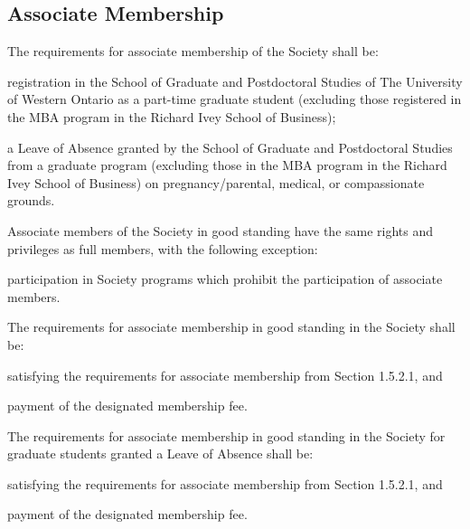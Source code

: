 \subsection{Associate Membership}
	\begin{longenum}[label*=\thesubsection.\arabic*., align=left]
  	\item  The requirements for associate membership of the Society shall be:
    	\begin{longenum}[label*=\arabic*., align=left]
    	\item registration in the School of Graduate and Postdoctoral Studies of The University of Western Ontario as a part-time graduate student (excluding those registered in the MBA program in the Richard Ivey School of Business);
    	\item a Leave of Absence granted by the School of Graduate and Postdoctoral Studies from a graduate program (excluding those in the MBA program in the Richard Ivey School of Business) on pregnancy/parental, medical, or compassionate grounds.
  	\end{longenum}
    \item Associate members of the Society in good standing have the same rights and privileges as full members, with the following exception:
    	\begin{longenum}[label*=\arabic*., align=left]
    	\item participation in Society programs which prohibit the participation of associate members.
  	\end{longenum}
    \item The requirements for associate membership in good standing in the Society shall be:
    \begin{longenum}[label*=\arabic*., align=left]
    	\item satisfying the requirements for associate membership from Section 1.5.2.1, and
        \item payment of the designated membership fee.
  	\end{longenum}
    \item  The requirements for associate membership in good standing in the Society for graduate students granted a Leave of Absence shall be:
        \begin{longenum}[label*=\arabic*., align=left]
    	\item satisfying the requirements for associate membership from Section 1.5.2.1, and
    	\item payment of the designated membership fee.

  	\end{longenum}
\end{longenum}

